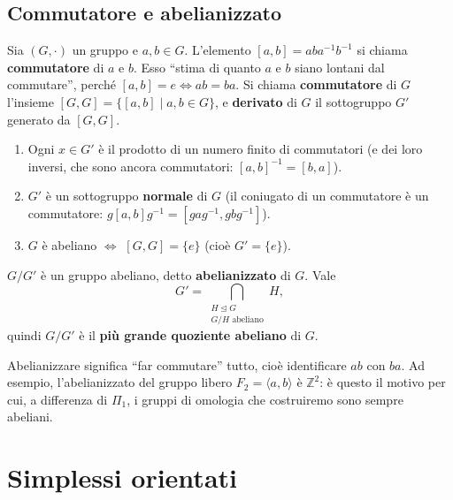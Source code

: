 \subsection{Commutatore e abelianizzato}

\begin{definicion}[Commutatore]
Sia $(G, \cdot)$ un gruppo e $a, b \in G$. L'elemento $[a, b] = a b a^{-1} b^{-1}$ si chiama \textbf{commutatore} di $a$ e $b$. Esso ``stima di quanto $a$ e $b$ siano lontani dal commutare'', perch\'e $[a,b] = e \iff ab = ba$. Si chiama \textbf{commutatore} di $G$ l'insieme $[G, G] = \{ [a,b] \mid a, b \in G \}$, e \textbf{derivato} di $G$ il sottogruppo $G'$ generato da $[G, G]$.
\end{definicion}

\begin{observacion}
\begin{enumerate}
    \item Ogni $x \in G'$ \`e il prodotto di un numero finito di commutatori (e dei loro inversi, che sono ancora commutatori: $[a,b]^{-1} = [b,a]$).
    \item $G'$ \`e un sottogruppo \textbf{normale} di $G$ (il coniugato di un commutatore \`e un commutatore: $g[a,b]g^{-1} = [gag^{-1}, gbg^{-1}]$).
    \item $G$ \`e abeliano $\iff$ $[G, G] = \{e\}$ (cio\`e $G' = \{e\}$).
\end{enumerate}
\end{observacion}

\begin{prop}
$G/G'$ \`e un gruppo abeliano, detto \textbf{abelianizzato} di $G$. Vale
\[
G' = \bigcap_{\substack{H \trianglelefteq G \\ G/H \text{ abeliano}}} H ,
\]
quindi $G/G'$ \`e il \textbf{pi\`u grande quoziente abeliano} di $G$.
\end{prop}
\begin{intuizione}
Abelianizzare significa ``far commutare'' tutto, cio\`e identificare $ab$ con $ba$. Ad esempio, l'abelianizzato del gruppo libero $F_2 = \langle a, b \rangle$ \`e $\mathbb{Z}^2$: \`e questo il motivo per cui, a differenza di $\Pi_1$, i gruppi di omologia che costruiremo sono sempre abeliani.
\end{intuizione}

\section{Simplessi orientati}

